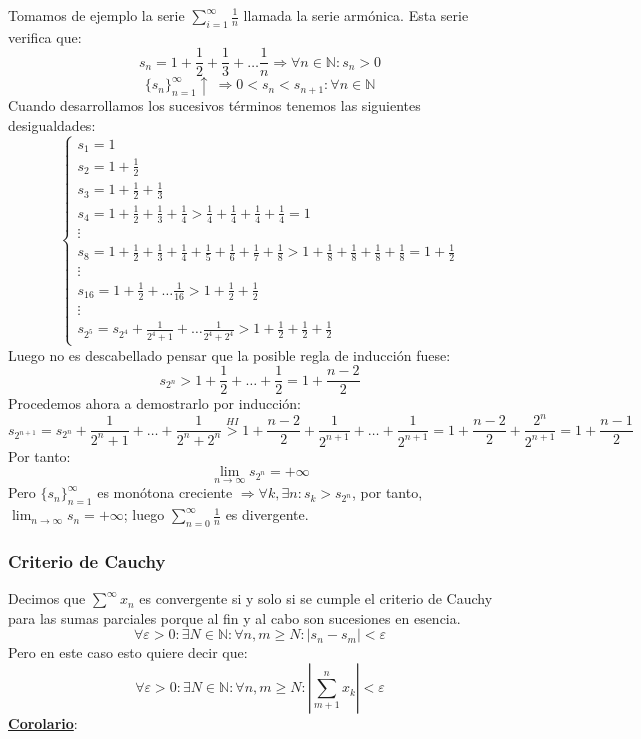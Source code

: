 \documentclass[10pt,a4paper,openright]{book}
\begin{document}
Tomamos de ejemplo la serie $\sum_{i = 1 }^{\infty} \frac{1}{n}$ llamada la serie armónica. Esta serie verifica que:
$$s_n = 1 + \frac{1}{2} + \frac{1}{3} + \ldots \frac{1}{n}\Rightarrow \forall n\in \mathbb N : s_n > 0$$
$$\{ s_n\}_{n=1}^\infty \uparrow \ \Rightarrow  0< s_n < s_{n+1}: \forall n \in \mathbb N$$
Cuando desarrollamos los sucesivos términos tenemos las siguientes desigualdades:
$$\begin{cases} s_1 = 1 \\ s_2 = 1 + \frac{1}{2} \\ s_3 =  1 + \frac{1}{2} + \frac{1}{3} \\ s_4 = 1 + \frac{1}{2} + \frac{1}{3} + \frac{1}{4} > \frac{1}{4} + \frac{1}{4} + \frac{1}{4} + \frac{1}{4} = 1 \\ \vdots \\ s_8 = 1 + \frac{1}{2} + \frac{1}{3} + \frac{1}{4} + \frac{1}{5} + \frac{1}{6} + \frac{1}{7} + \frac{1}{8} > 1 + \frac{1}{8} + \frac{1}{8} + \frac{1}{8} + \frac{1}{8} = 1 + \frac{1}{2} \\ \vdots \\ s_{16} = 1 + \frac{1}{2} + \ldots \frac{1}{16} >1 + \frac{1}{2} + \frac{1}{2} \\ \vdots \\ s_{2^5} = s_{2^4} + \frac{1}{2^4 + 1} + \ldots \frac{1}{2^4 + 2^4} > 1 + \frac{1}{2} + \frac{1}{2} + \frac{1}{2}\end{cases}$$
Luego no es descabellado pensar que la posible regla de inducción fuese:
$$s_{2^n} > 1 + \frac{1}{2} + \ldots + \frac{1}{2} = 1 + \frac{n-2}{2}$$
Procedemos ahora a demostrarlo por inducción:
$$s_{2^{n+1}} = s_{2^n} + \frac{1}{2^n + 1} + \ldots + \frac{1}{2^n + 2^n} \overset{HI}{>} 1 +  \frac{n-2}{2} + \frac{1}{2^{n + 1}} + \ldots  + \frac{1}{2^{n + 1}} = 1+\frac{n-2}{2}+\frac{2^n}{2^{n+1}}= 1 + \frac{n-1}{2}$$
Por tanto:
$$\lim_{n \to \infty} s_{2^n} = + \infty$$
Pero $\{s_n\}_{n=1}^\infty$ es monótona creciente $\Rightarrow \forall k, \exists n: s_k >s_{2^n}$, por tanto, $\lim_{n \to \infty} s_n = + \infty$; luego $\sum_{n=0}^{\infty} \frac{1}{n}$ es divergente.

\subsubsection*{Criterio de Cauchy}
Decimos que $\sum^{\infty} x_n$ es convergente si y solo si se cumple el criterio de Cauchy para las sumas parciales porque al fin y al cabo son sucesiones en esencia.
$$\forall \varepsilon >0 : \exists N\in \mathbb N: \forall n,m\geq N: |s_n-s_m|<\varepsilon$$
Pero en este caso esto quiere decir que:
$$\forall \varepsilon >0 : \exists N\in \mathbb N: \forall n,m\geq N: \left|\sum_{m+1}^{n} x_k\right|<\varepsilon$$
\underline{\textbf{Corolario}}:
\end{document}
